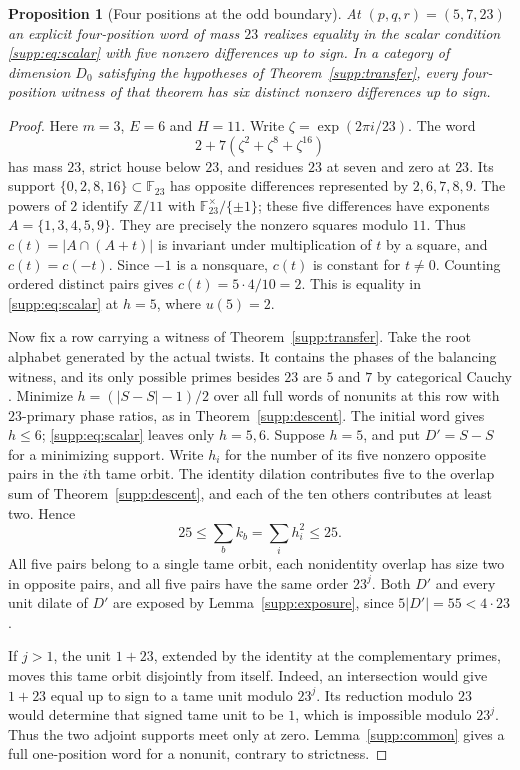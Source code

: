 \documentclass[11pt,a4paper]{article}
\numberwithin{equation}{section}
\newtheorem{proposition}[theorem]{Proposition}
\begin{document}
\begin{proposition}[Four positions at the odd boundary]\label{supp:eleven-mask}
At $(p,q,r)=(5,7,23)$ an explicit four-position word of mass $23$
realizes equality in the scalar condition \eqref{supp:eq:scalar} with
five nonzero differences up to sign. In a category of dimension $D_0$
satisfying the hypotheses of Theorem~\ref{supp:transfer}, every
four-position witness of that theorem has six distinct nonzero
differences up to sign.
\end{proposition}
\begin{proof}
Here $m=3$, $E=6$ and $H=11$. Write $\zeta=\exp(2\pi i/23)$.
The word
\[
                    2+7(\zeta^2+\zeta^8+\zeta^{16})
\]
has mass $23$, strict house below $23$, and residues $23$ at seven
and zero at $23$. Its support $\{0,2,8,16\}\subset\mathbb F_{23}$
has opposite differences represented by $2,6,7,8,9$. The powers of
$2$ identify $\mathbb Z/11$ with $\mathbb F_{23}^\times/\{\pm1\}$;
these five differences have exponents $A=\{1,3,4,5,9\}$.
They are precisely the nonzero squares modulo $11$. Thus
$c(t)=|A\cap(A+t)|$ is invariant under multiplication of $t$ by a
square, and $c(t)=c(-t)$. Since $-1$ is a nonsquare, $c(t)$ is
constant for $t\ne0$. Counting ordered distinct pairs gives
$c(t)=5\cdot4/10=2$. This is equality in
\eqref{supp:eq:scalar} at $h=5$, where $u(5)=2$.

Now fix a row carrying a witness of Theorem~\ref{supp:transfer}.
Take the root alphabet generated by the actual twists. It contains the
phases of the balancing witness, and its only possible primes besides $23$
are $5$ and $7$ by categorical Cauchy \cite[Theorem~3.9]{BNRWFinite}.
Minimize $h=(|S-S|-1)/2$ over all full words of nonunits at this row
with $23$-primary phase ratios, as in Theorem~\ref{supp:descent}.
The initial word gives $h\le6$; \eqref{supp:eq:scalar} leaves only
$h=5,6$. Suppose $h=5$, and put $D'=S-S$ for a minimizing support.
Write $h_i$ for the number of its five nonzero opposite pairs in the
$i$th tame orbit. The identity dilation contributes five to the overlap
sum of Theorem~\ref{supp:descent}, and each of the ten others
contributes at least two. Hence
\[
           25\le\sum_b k_b=\sum_i h_i^2\le25.
\]
All five pairs belong to a single tame orbit, each nonidentity overlap
has size two in opposite pairs, and all five pairs have the same
order $23^j$. Both $D'$ and every unit dilate of $D'$ are exposed by
Lemma~\ref{supp:exposure}, since $5|D'|=55<4\cdot23$.

If $j>1$, the unit $1+23$, extended by the identity at the
complementary primes, moves this tame orbit disjointly from itself.
Indeed, an intersection would give $1+23$ equal up to sign to a tame
unit modulo $23^j$. Its reduction modulo $23$ would determine that
signed tame unit to be $1$, which is impossible modulo $23^j$.
Thus the two adjoint supports meet only at zero.
Lemma~\ref{supp:common} gives a full one-position word for a nonunit,
contrary to strictness.


\end{proof}
\end{document}
